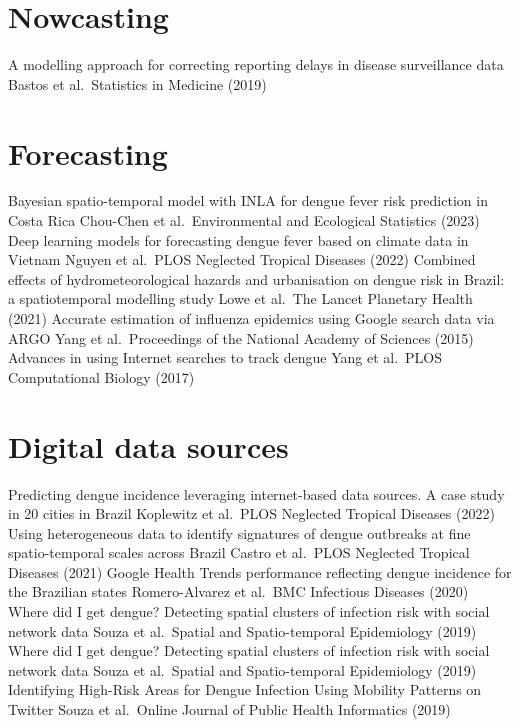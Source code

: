 \documentclass[
  letterpaper,
  DIV=11,
  numbers=noendperiod]{scrreprt}
\begin{document}
\hypertarget{nowcasting-1}{%
\section{Nowcasting}\label{nowcasting-1}}

A modelling approach for correcting reporting delays in disease
surveillance data Bastos et al.~Statistics in Medicine (2019)

\hypertarget{forecasting-1}{%
\section{Forecasting}\label{forecasting-1}}

Bayesian spatio-temporal model with INLA for dengue fever risk
prediction in Costa Rica Chou-Chen et al.~Environmental and Ecological
Statistics (2023) Deep learning models for forecasting dengue fever
based on climate data in Vietnam Nguyen et al.~PLOS Neglected Tropical
Diseases (2022) Combined effects of hydrometeorological hazards and
urbanisation on dengue risk in Brazil: a spatiotemporal modelling study
Lowe et al.~The Lancet Planetary Health (2021) Accurate estimation of
influenza epidemics using Google search data via ARGO Yang et
al.~Proceedings of the National Academy of Sciences (2015) Advances in
using Internet searches to track dengue Yang et al.~PLOS Computational
Biology (2017)

\hypertarget{digital-data-sources-1}{%
\section{Digital data sources}\label{digital-data-sources-1}}

Predicting dengue incidence leveraging internet-based data sources. A
case study in 20 cities in Brazil Koplewitz et al.~PLOS Neglected
Tropical Diseases (2022) Using heterogeneous data to identify signatures
of dengue outbreaks at fine spatio-temporal scales across Brazil Castro
et al.~PLOS Neglected Tropical Diseases (2021) Google Health Trends
performance reflecting dengue incidence for the Brazilian states
Romero-Alvarez et al.~BMC Infectious Diseases (2020) Where did I get
dengue? Detecting spatial clusters of infection risk with social network
data Souza et al.~Spatial and Spatio-temporal Epidemiology (2019) Where
did I get dengue? Detecting spatial clusters of infection risk with
social network data Souza et al.~Spatial and Spatio-temporal
Epidemiology (2019) Identifying High-Risk Areas for Dengue Infection
Using Mobility Patterns on Twitter Souza et al.~Online Journal of Public
Health Informatics (2019)
\end{document}
